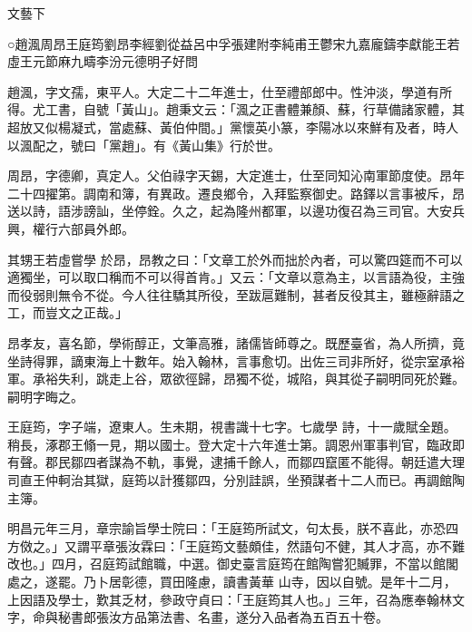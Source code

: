 
\begin{pinyinscope}

 文藝下



 ○趙渢周昂王庭筠劉昂李經劉從益呂中孚張建附李純甫王鬱宋九嘉龐鑄李獻能王若虛王元節麻九疇李汾元德明子好問



 趙渢，字文孺，東平人。大定二十二年進士，仕至禮部郎中。性沖淡，學道有所得。尤工書，自號「黃山」。趙秉文云：「渢之正書體兼顏、蘇，行草備諸家體，其超放又似楊凝式，當處蘇、黃伯仲間。」黨懷英小篆，李陽冰以來鮮有及者，時人以渢配之，號曰「黨趙」。有《黃山集》行於世。



 周昂，字德卿，真定人。父伯祿字天錫，大定進士，仕至同知沁南軍節度使。昂年二十四擢第。調南和簿，有異政。遷良鄉令，入拜監察御史。路鐸以言事被斥，昂送以詩，語涉謗訕，坐停銓。久之，起為隆州都軍，以邊功復召為三司官。大安兵興，權行六部員外郎。



 其甥王若虛嘗學
 於昂，昂教之曰：「文章工於外而拙於內者，可以驚四筵而不可以適獨坐，可以取口稱而不可以得首肯。」又云：「文章以意為主，以言語為役，主強而役弱則無令不從。今人往往驕其所役，至跋扈難制，甚者反役其主，雖極辭語之工，而豈文之正哉。」



 昂孝友，喜名節，學術醇正，文筆高雅，諸儒皆師尊之。既歷臺省，為人所擠，竟坐詩得罪，謫東海上十數年。始入翰林，言事愈切。出佐三司非所好，從宗室承裕軍。承裕失利，跳走上谷，眾欲徑歸，昂獨不從，城陷，與其從子嗣明同死於難。嗣明字晦之。



 王庭筠，字子端，遼東人。生未期，視書識十七字。七歲學
 詩，十一歲賦全題。稍長，涿郡王翛一見，期以國士。登大定十六年進士第。調恩州軍事判官，臨政即有聲。郡民鄒四者謀為不軌，事覺，逮捕千餘人，而鄒四竄匿不能得。朝廷遣大理司直王仲軻治其獄，庭筠以計獲鄒四，分別詿誤，坐預謀者十二人而已。再調館陶主簿。



 明昌元年三月，章宗諭旨學士院曰：「王庭筠所試文，句太長，朕不喜此，亦恐四方傚之。」又謂平章張汝霖曰：「王庭筠文藝頗佳，然語句不健，其人才高，亦不難改也。」四月，召庭筠試館職，中選。御史臺言庭筠在館陶嘗犯贓罪，不當以館閣處之，遂罷。乃卜居彰德，買田隆慮，讀書黃華
 山寺，因以自號。是年十二月，上因語及學士，歎其乏材，參政守貞曰：「王庭筠其人也。」三年，召為應奉翰林文字，命與秘書郎張汝方品第法書、名畫，遂分入品者為五百五十卷。




\end{pinyinscope}
